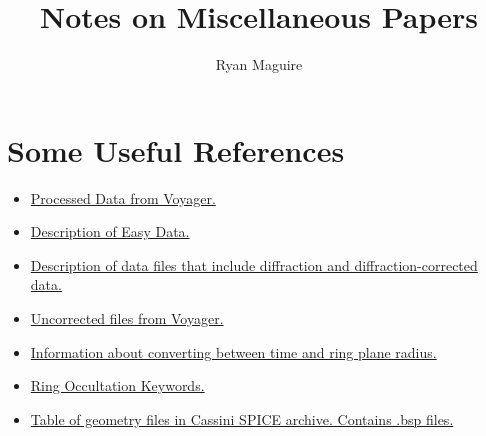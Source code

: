 \documentclass{article}
\begin{document}
    \title{Notes on Miscellaneous Papers}
    \author{Ryan Maguire}
    \date{\vspace{-5ex}}
    \maketitle
    \tableofcontents
    \listoffigures
    \listoftables
    \clearpage
    \section{Some Useful References}
        \begin{itemize}[itemsep=0pt]
            \item \href{https://pds-rings.seti.org/%
                        voyager/rss/index.html}
                       {Processed Data from Voyager.}
            \item \href{https://pds-rings.seti.org/volumes/%
                        VG_28xx_peer_review/VG_2803/S_RINGS/%
                        EASYDATA/DATAINFO.TXT}
                       {Description of Easy Data.}
            \item \href{https://pds-rings.seti.org/volumes/%
                        VG_28xx_peer_review/VG_2803/S_RINGS/%
                        EDITDATA/DATAINFO.TXT}
                       {Description of data files that include%
                        diffraction and diffraction-corrected%
                        data.}
            \item \href{https://pds-rings.seti.org/volumes/%
                        VG_28xx_peer_review/VG_2803/S_RINGS/%
                        EDITDATA/RS1D1XUI.LBL}
                       {Uncorrected files from Voyager.}
            \item \href{https://pds-rings.seti.org/volumes/%
                        VG_28xx_peer_review/VG_2803/S_RINGS/%
                        GEOMETRY/GEOMINFO.TXT}
                       {Information about converting between
                        time and ring plane radius.}
            \item \href{https://pds-rings.seti.org/holdings/%
                        volumes/COVIMS_8xxx_lien_resolution/%
                        COVIMS_8001/DOCUMENT/%
                        Occultation_Keywords.pdf}
                       {Ring Occultation Keywords.}
            \item \href{https://naif.jpl.nasa.gov/pub/%
                        naif/pds/data/co-s_j_e_v-spice-6-v1.0/%
                        cosp_1000/data/pck/pckinfo.txt}
                       {Table of geometry files in Cassini
                        SPICE archive. Contains .bsp files.}
        \end{itemize}
\end{document}
